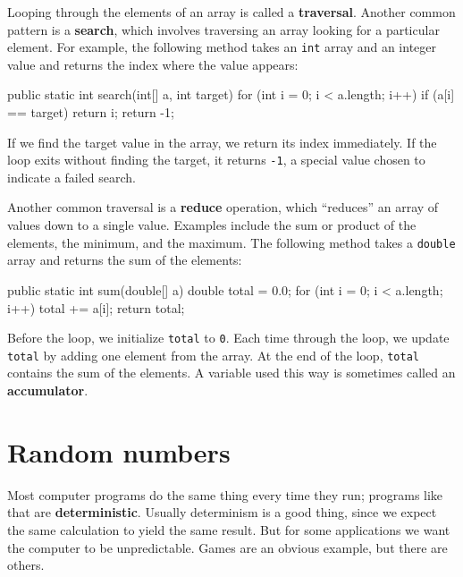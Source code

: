 \documentclass[12pt]{book}
\theoremstyle{exercise}
\newcommand{\java}[1]{\verb"#1"}
\begin{document}
Looping through the elements of an array is called a {\bf traversal}.
Another common pattern is a {\bf search}, which involves traversing an array looking for a particular element.
For example, the following method takes an \java{int} array and an integer value and returns the index where the value appears:


\begin{code}
public static int search(int[] a, int target) {
    for (int i = 0; i < a.length; i++) {
        if (a[i] == target) {
            return i;
        }
    }
    return -1;
}
\end{code}

If we find the target value in the array, we return its index immediately.
If the loop exits without finding the target, it returns \java{-1}, a special value chosen to indicate a failed search.


Another common traversal is a {\bf reduce} operation, which ``reduces'' an array of values down to a single value.
Examples include the sum or product of the elements, the minimum, and the maximum.
The following method takes a \java{double} array and returns the sum of the elements:

\begin{code}
public static int sum(double[] a) {
    double total = 0.0;
    for (int i = 0; i < a.length; i++) {
        total += a[i];
    }
    return total;
}
\end{code}

Before the loop, we initialize \java{total} to \java{0}.
Each time through the loop, we update \java{total} by adding one element from the array.
At the end of the loop, \java{total} contains the sum of the elements.
A variable used this way is sometimes called an {\bf accumulator}.


\section{Random numbers}
\label{random}
\label{pseudorandom}


Most computer programs do the same thing every time they run; programs like that are {\bf deterministic}.
Usually determinism is a good thing, since we expect the same calculation to yield the same result.
But for some applications we want the computer to be unpredictable.
Games are an obvious example, but there are others.
\end{document}
